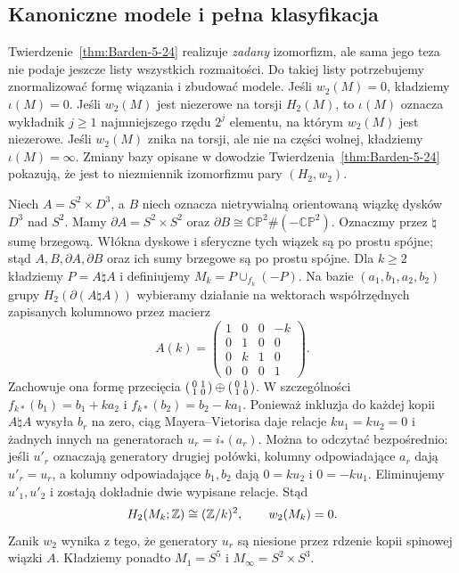 \subsection*{Kanoniczne modele i pełna klasyfikacja}

Twierdzenie~\ref{thm:Barden-5-24}
realizuje \emph{zadany} izomorfizm,
ale sama jego teza nie podaje jeszcze
listy wszystkich rozmaitości.
Do takiej listy potrzebujemy znormalizować
formę wiązania i zbudować modele.
Jeśli $w_2(M)=0$, kładziemy $\iota(M)=0$.
Jeśli $w_2(M)$ jest niezerowe na torsji
$H_2(M)$, to $\iota(M)$ oznacza
wykładnik $j\geq1$ najmniejszego
rzędu $2^j$ elementu, na którym
$w_2(M)$ jest niezerowe.
Jeśli $w_2(M)$ znika na torsji,
ale nie na części wolnej,
kładziemy $\iota(M)=\infty$.
Zmiany bazy opisane w dowodzie
Twierdzenia~\ref{thm:Barden-5-24}
pokazują, że jest to niezmiennik
izomorfizmu pary $(H_2,w_2)$.

Niech $A=S^2\times D^3$, a $B$ niech
oznacza nietrywialną orientowaną
wiązkę dysków $D^3$ nad $S^2$.
Mamy $\partial A=S^2\times S^2$
oraz $\partial B\cong\mathbb{CP}^2\#(-\mathbb{CP}^2)$.
Oznaczmy przez $\natural$ sumę brzegową.
Włókna dyskowe i sferyczne tych
wiązek są po prostu spójne; stąd
$A,B,\partial A,\partial B$ oraz ich
sumy brzegowe są po prostu spójne.
Dla $k\geq2$ kładziemy
$P=A\natural A$ i definiujemy
$M_k=P\cup_{f_k}(-P)$.
Na bazie
$(a_1,b_1,a_2,b_2)$ grupy
$H_2(\partial(A\natural A))$
wybieramy działanie na wektorach
współrzędnych zapisanych kolumnowo
przez macierz
\[
 A(k)=\begin{pmatrix}
 1&0&0&-k\\0&1&0&0\\
 0&k&1&0\\0&0&0&1
 \end{pmatrix}.
\]
Zachowuje ona formę przecięcia
$\begin{psmallmatrix}0&1\\1&0\end{psmallmatrix}
\oplus\begin{psmallmatrix}0&1\\1&0\end{psmallmatrix}$.
W szczególności
$f_{k*}(b_1)=b_1+k a_2$ i
$f_{k*}(b_2)=b_2-k a_1$.
Ponieważ inkluzja do każdej kopii
$A\natural A$ wysyła $b_r$ na zero,
ciąg Mayera--Vietorisa daje relacje
$ku_1=ku_2=0$ i żadnych innych
na generatorach $u_r=i_*(a_r)$.
Można to odczytać bezpośrednio: jeśli $u'_r$
oznaczają generatory drugiej połówki, kolumny
odpowiadające $a_r$ dają $u'_r=u_r$, a kolumny
odpowiadające $b_1,b_2$ dają $0=ku_2$ i $0=-ku_1$.
Eliminujemy $u'_1,u'_2$ i zostają dokładnie dwie
wypisane relacje.
Stąd
\[
 H_2(M_k;\mathbb{Z})\cong(\mathbb{Z}/k)^2,
 \qquad w_2(M_k)=0.
\]
Zanik $w_2$ wynika z tego, że
generatory $u_r$ są niesione przez
rdzenie kopii spinowej wiązki $A$.
Kładziemy ponadto
$M_1=S^5$ i $M_\infty=S^2\times S^3$.

